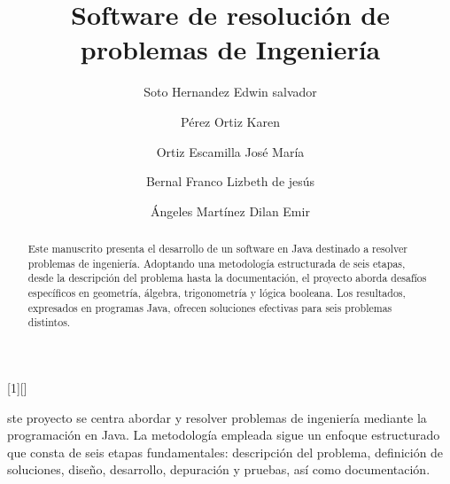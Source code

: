 \documentclass{IEEEcsmag}
\begin{document}
[1][]
{}
{}



\title{Software de resolución de problemas de Ingeniería }


\author{Soto Hernandez Edwin salvador}

\author{Pérez Ortiz Karen }

\author{Ortiz Escamilla José María}

\author{Bernal Franco Lizbeth de jesús}

\author{Ángeles Martínez Dilan Emir}



\begin{abstract}
Este manuscrito presenta el desarrollo de un software en Java destinado a resolver problemas de ingeniería. Adoptando una metodología estructurada de seis etapas, desde la descripción del problema hasta la documentación, el proyecto aborda desafíos específicos en geometría, álgebra, trigonometría y lógica booleana. Los resultados, expresados en programas Java, ofrecen soluciones efectivas para seis problemas distintos. 
\end{abstract}

\maketitle
{}ste proyecto se centra abordar y resolver problemas de ingeniería mediante la programación en Java. La metodología empleada sigue un enfoque estructurado que consta de seis etapas fundamentales: descripción del problema, definición de soluciones, diseño, desarrollo, depuración y pruebas, así como documentación.
\end{document}
